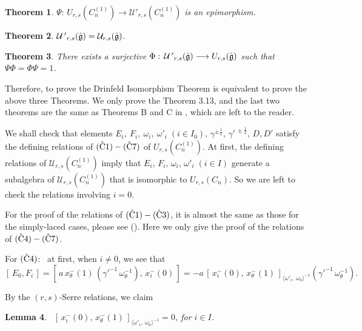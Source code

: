 \documentclass{amsproc}
\newtheorem{theo}{Theorem}[section]
\newtheorem{lemm}[theo]{Lemma}
\theoremstyle{remark}
\numberwithin{equation}{section}
\begin{document}
\begin{theo}
$\Psi:\,U_{r,s}(C_n^{(1)}) \longrightarrow {\mathcal
U}'_{r,s}(C_n^{(1)})$ is an epimorphism.
\end{theo}

\begin{theo}
{\quad  ${\mathcal
U\,'}_{r,s}(\hat{\frak {g}})={\mathcal U}_{r,s}(\hat{\frak {g}})$.}
\end{theo}

\begin{theo}
There exists a surjective $\Phi:\,{\mathcal U\,'}_{r,s}(\hat{\frak {g}}) \longrightarrow U_{r,s}(\hat{\frak {g}})$ such that $\Psi\Phi=\Phi\Psi=1$.
\end{theo}
Therefore, to prove the Drinfeld Isomorphism Theorem is equivalent
to prove the above three Theorems. We only prove the Theorem 3.13,
and the last two theorems are the same as Theorems B and C in
\cite{HZ}, which are left to the reader.

\medskip

  We shall check that elements
$E_i,~F_i,~{\omega}_i,~{\omega}'_i\; (i\in I_0),\, \gamma^{\pm\frac{1}2}$, $
\gamma'^{\,\pm\frac{1}2},\, D, D'$ satisfy the defining relations of
$(\hat{\rm C}1)-(\hat{\rm C}7)$ of $U_{r,s}(C_n^{(1)})$. At first,
the defining relations of ${\mathcal U}_{r,s}(C_n^{(1)})$ imply that
$E_i,\,F_i,\,{\omega}_i,\,{\omega}'_i \; (i\in I)$ generate a subalgebra of
${\mathcal U}_{r,s}(C_n^{(1)})$ that is isomorphic to
$U_{r,s}({C}_n)$. So we are left to check the relations involving
$i=0$.

For the proof of the relations of
$(\hat{\rm C}1)-(\hat{\rm C}3)$, it is almost the same as those for the simply-laced cases, please see (\cite{HZ}).
Here we only give the proof of the relations of $(\hat{\rm C}4)-(\hat{\rm C}7)$.

For $(\hat{\rm C}4)$: \ at first, when $i\neq 0$, we see that
$$
[\,E_0,F_i\,]
=[\,a\,x_{\theta}^-(1) \,(\gamma'^{-1}\,{\omega}_{\theta}^{-1}),\,
x_i^-{(0)}\,] =- a\,[\,x_i^-{(0)},\,x_{\theta}^-(1) \,]_{\langle
\omega'_i,~ \omega_0 \rangle^{-1}}
(\gamma'^{-1}\,{\omega}_{\theta}^{-1}).
$$

By the $(r,s)$-Serre relations, we claim
\begin{lemm} \ $[\,x_i^-{(0)},\, x_{\theta}^-(1)\,]_{\langle \omega'_i,~ \omega_0
\rangle^{-1}}=0$, for $i\in I$.
\end{lemm}
\end{document}
